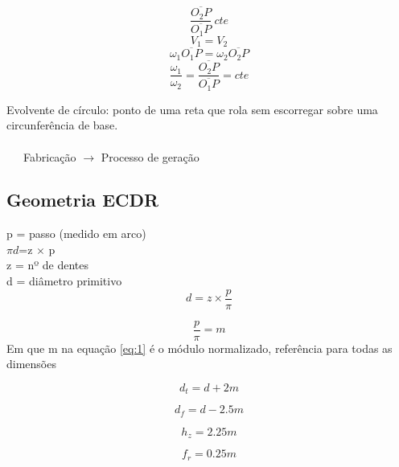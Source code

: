 
\[\frac{\overline{O_{2}P}}{\overline{O_{1}P}} \ cte\]
\[V_{1}=V_{2}\]
\[\omega _{1}\overline{O_{1}P} = \omega _{2}\overline{O_{2}P}\]
\[\frac{\omega _{1}}{\omega _{2}} = \frac{\overline{O_{2}P}}{\overline{O_{1}P}} = cte \]

Evolvente de círculo: ponto de uma reta que rola sem escorregar sobre uma circunferência de base.
\\
\\
\ \ \ Fabricação $\rightarrow$ Processo de geração
\\

\subsection{Geometria ECDR}



p = passo (medido em arco) \\
$\pi d$=z $\times$ p \\
z = nº de dentes \\
d = diâmetro primitivo \\

\[d = z \times \frac{p}{\pi} \]

\begin{equation}
\frac{p}{\pi} = m
\label{eq:1}
\end{equation}
Em que m na equação \ref{eq:1} é o módulo normalizado, referência para todas as dimensões

\begin{equation}
d_{t} = d + 2m
\label{eq:2}
\end{equation}

\begin{equation}
d_{f} = d - 2.5m
\label{eq:3}
\end{equation}

\begin{equation}
h_{z} = 2.25m
\label{eq:4}
\end{equation}

\begin{equation}
f_{r}=0.25m
\label{eq:5}
\end{equation}

